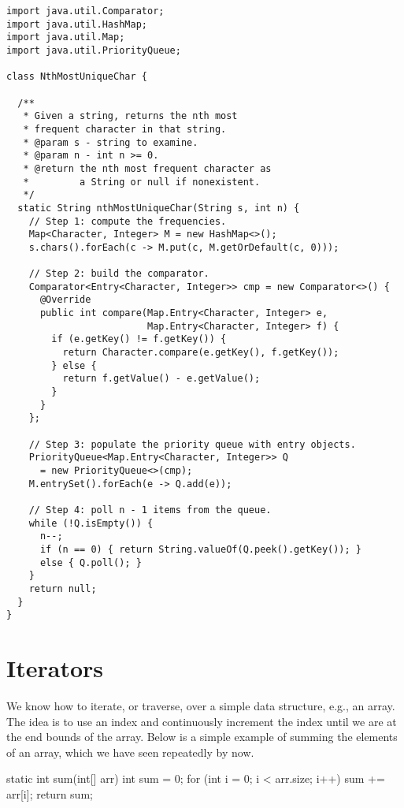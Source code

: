 \begin{lstlisting}[language=MyJava]
import java.util.Comparator;
import java.util.HashMap;
import java.util.Map;
import java.util.PriorityQueue;

class NthMostUniqueChar {

  /**
   * Given a string, returns the nth most 
   * frequent character in that string.
   * @param s - string to examine.
   * @param n - int n >= 0.
   * @return the nth most frequent character as 
   *         a String or null if nonexistent.
   */
  static String nthMostUniqueChar(String s, int n) {
    // Step 1: compute the frequencies.
    Map<Character, Integer> M = new HashMap<>();
    s.chars().forEach(c -> M.put(c, M.getOrDefault(c, 0))); 

    // Step 2: build the comparator.
    Comparator<Entry<Character, Integer>> cmp = new Comparator<>() {
      @Override
      public int compare(Map.Entry<Character, Integer> e, 
                         Map.Entry<Character, Integer> f) {
        if (e.getKey() != f.getKey()) {
          return Character.compare(e.getKey(), f.getKey());
        } else {
          return f.getValue() - e.getValue();
        }
      }
    };

    // Step 3: populate the priority queue with entry objects.
    PriorityQueue<Map.Entry<Character, Integer>> Q 
      = new PriorityQueue<>(cmp);
    M.entrySet().forEach(e -> Q.add(e));

    // Step 4: poll n - 1 items from the queue.
    while (!Q.isEmpty()) {
      n--;
      if (n == 0) { return String.valueOf(Q.peek().getKey()); } 
      else { Q.poll(); }
    }
    return null;
  }
}
\end{lstlisting}

\section{Iterators}
We know how to iterate, or traverse, over a simple data structure, e.g., an array. The idea is to use an index and continuously increment the index until we are at the end bounds of the array. Below is a simple example of summing the elements of an array, which we have seen repeatedly by now.

\begin{verbnobox}[\small]
static int sum(int[] arr) {
  int sum = 0;
  for (int i = 0; i < arr.size; i++) { sum += arr[i]; }
  return sum;
}
\end{verbnobox}

